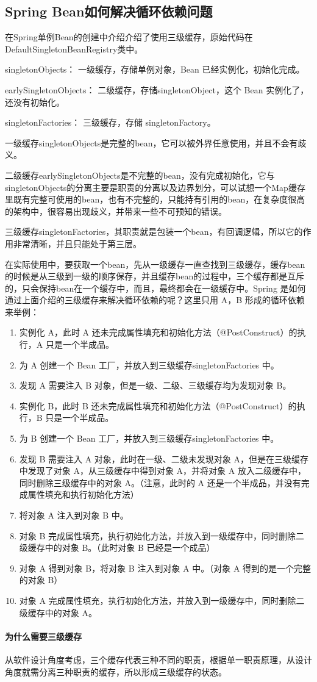 \documentclass[../../../interview-questions.tex]{subfiles}
\begin{document}
\subsection{Spring Bean如何解决循环依赖问题}

在Spring单例Bean的创建中介绍介绍了使用三级缓存，原始代码在DefaultSingletonBeanRegistry类中。

singletonObjects： 一级缓存，存储单例对象，Bean 已经实例化，初始化完成。

earlySingletonObjects： 二级缓存，存储singletonObject，这个 Bean 实例化了，还没有初始化。

singletonFactories： 三级缓存，存储 singletonFactory。

一级缓存singletonObjects是完整的bean，它可以被外界任意使用，并且不会有歧义。

二级缓存earlySingletonObjects是不完整的bean，没有完成初始化，它与singletonObjects的分离主要是职责的分离以及边界划分，可以试想一个Map缓存里既有完整可使用的bean，也有不完整的，只能持有引用的bean，在复杂度很高的架构中，很容易出现歧义，并带来一些不可预知的错误。

三级缓存singletonFactories，其职责就是包装一个bean，有回调逻辑，所以它的作用非常清晰，并且只能处于第三层。

在实际使用中，要获取一个bean，先从一级缓存一直查找到三级缓存，缓存bean的时候是从三级到一级的顺序保存，并且缓存bean的过程中，三个缓存都是互斥的，只会保持bean在一个缓存中，而且，最终都会在一级缓存中。Spring 是如何通过上面介绍的三级缓存来解决循环依赖的呢？这里只用 A，B 形成的循环依赖来举例：

\begin{enumerate}
    \item {实例化 A，此时 A 还未完成属性填充和初始化方法（@PostConstruct）的执行，A 只是一个半成品。}
    \item {为 A 创建一个 Bean 工厂，并放入到三级缓存singletonFactories 中。}
    \item {发现 A 需要注入 B 对象，但是一级、二级、三级缓存均为发现对象 B。}
    \item {实例化 B，此时 B 还未完成属性填充和初始化方法（@PostConstruct）的执行，B 只是一个半成品。}
    \item {为 B 创建一个 Bean 工厂，并放入到三级缓存singletonFactories 中。}
    \item {发现 B 需要注入 A 对象，此时在一级、二级未发现对象 A，但是在三级缓存中发现了对象 A，从三级缓存中得到对象 A，并将对象 A 放入二级缓存中，同时删除三级缓存中的对象 A。（注意，此时的 A 还是一个半成品，并没有完成属性填充和执行初始化方法）}
    \item {将对象 A 注入到对象 B 中。}
    \item {对象 B 完成属性填充，执行初始化方法，并放入到一级缓存中，同时删除二级缓存中的对象 B。（此时对象 B 已经是一个成品）}
    \item {对象 A 得到对象 B，将对象 B 注入到对象 A 中。（对象 A 得到的是一个完整的对象 B）}
    \item {对象 A 完成属性填充，执行初始化方法，并放入到一级缓存中，同时删除二级缓存中的对象 A。}
\end{enumerate}

\paragraph{为什么需要三级缓存}

从软件设计角度考虑，三个缓存代表三种不同的职责，根据单一职责原理，从设计角度就需分离三种职责的缓存，所以形成三级缓存的状态。
\end{document}
